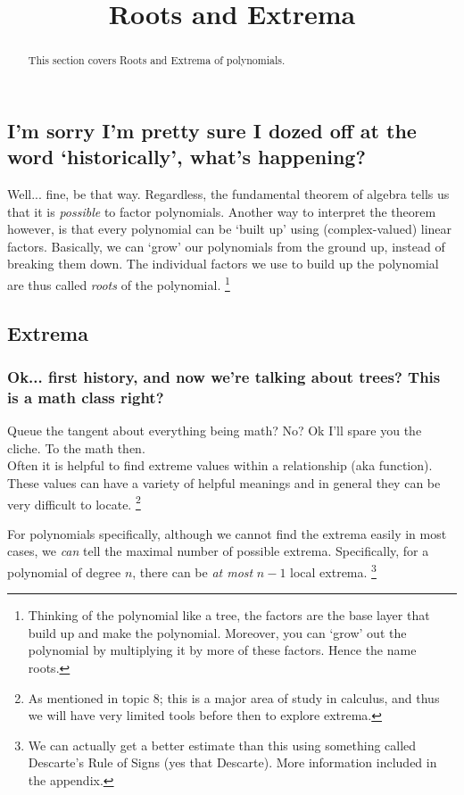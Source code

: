 \documentclass{ximera}
\title{Roots and Extrema}
\begin{document}
\begin{abstract}
This section covers Roots and Extrema of polynomials.
\end{abstract}
\maketitle

\subsection*{I'm sorry I'm pretty sure I dozed off at the word `historically', what's happening?}

    Well... fine, be that way. Regardless, the fundamental theorem of algebra tells us that it is \textit{possible} to factor polynomials. Another way to interpret the theorem however, is that every polynomial can be `built up' using (complex-valued) linear factors. Basically, we can `grow' our polynomials from the ground up, instead of breaking them down. The individual factors we use to build up the polynomial are thus called \textit{roots} of the polynomial.%
    \footnote{Thinking of the polynomial like a tree, the factors are the base layer that build up and make the polynomial. Moreover, you can `grow' out the polynomial by multiplying it by more of these factors. Hence the name roots.}


\subsection*{Extrema}
    \subsubsection*{Ok... first history, and now we're talking about trees? This is a math class right?}
        Queue the tangent about everything being math? No? Ok I'll spare you the cliche. To the math then.\\
        Often it is helpful to find extreme values within a relationship (aka function). These values can have a variety of helpful meanings and in general they can be very difficult to locate.%
        \footnote{As mentioned in topic 8; this is a major area of study in calculus, and thus we will have very limited tools before then to explore extrema.}
        
        For polynomials specifically, although we cannot find the extrema easily in most cases, we \textit{can} tell the maximal number of possible extrema. Specifically, for a polynomial of degree $n$, there can be \textit{at most} $n-1$ local extrema.%
        \footnote{We can actually get a better estimate than this using something called Descarte's Rule of Signs (yes that Descarte). More information included in the appendix.}
            
\end{document}
